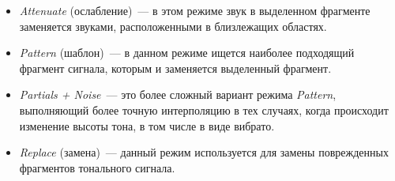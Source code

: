 \documentclass{beamer}
\begin{document}
\begin{frame}
\begin{itemize}
  \item \emph{Attenuate} (ослабление)~--- в этом режиме звук в выделенном фрагменте заменяется звуками, расположенными в близлежащих областях.
  \item \emph{Pattern} (шаблон)~--- в данном режиме ищется наиболее подходящий фрагмент сигнала, которым и заменяется выделенный фрагмент.
  \item \emph{Partials + Noise}~--- это более сложный вариант режима \emph{Pattern}, выполняющий более точную интерполяцию в тех случаях, когда происходит изменение высоты тона, в том числе в виде вибрато.
\end{itemize}
\end{frame}

\begin{frame}
\begin{itemize}
  \item \emph{Replace} (замена)~--- данный режим используется для замены поврежденных фрагментов тонального сигнала.
\end{itemize}
\end{frame}
\end{document}
